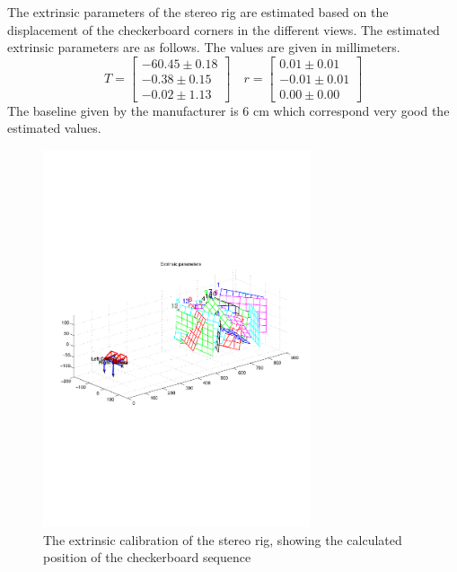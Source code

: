 The extrinsic parameters of the stereo rig are estimated based on the displacement of the
checkerboard corners in the different views. The estimated extrinsic parameters are as
follows. The values are given in millimeters. 
\begin{equation}
    T = \left[ \begin{matrix}
                -60.45 \pm 0.18\\
                -0.38 \pm 0.15\\
                -0.02 \pm  1.13 \end{matrix} \right] \quad 
    r = \left[ \begin{matrix}
                0.01 \pm 0.01\\
                -0.01 \pm 0.01 \\
                0.00 \pm 0.00  \end{matrix} \right]
\end{equation}
The baseline given by the manufacturer is 6 cm which correspond very good the estimated
values.
\begin{figure}[hbtp]
    \centering
    \includegraphics[width=0.7\textwidth]{pics/stereo-extrinsic}
    \caption{The extrinsic calibration of the stereo rig, showing the calculated position
    of the checkerboard sequence}
    \label{chap3:fig-stereo-extrinsic}
\end{figure}


